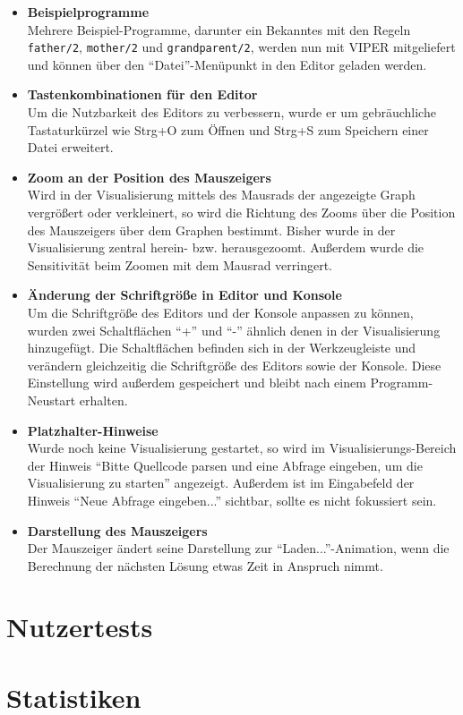 \documentclass[parskip=full,11pt,twoside]{scrartcl}
\begin{document}
\begin{itemize}
  \item \textbf{Beispielprogramme}\\
        Mehrere Beispiel-Programme, darunter ein Bekanntes mit den Regeln \texttt{father/2}, \texttt{mother/2} und \texttt{grandparent/2}, werden nun mit VIPER mitgeliefert und können über den \enquote{Datei}-Menüpunkt in den Editor geladen werden.
  \item \textbf{Tastenkombinationen für den Editor}\\
        Um die Nutzbarkeit des Editors zu verbessern, wurde er um gebräuchliche Tastaturkürzel wie Strg+O zum Öffnen und Strg+S zum Speichern einer Datei erweitert.
  \item \textbf{Zoom an der Position des Mauszeigers}\\
        Wird in der Visualisierung mittels des Mausrads der angezeigte Graph vergrößert oder verkleinert, so wird die Richtung des Zooms über die Position des Mauszeigers über dem Graphen bestimmt. Bisher wurde in der Visualisierung zentral herein- bzw. herausgezoomt. Außerdem wurde die Sensitivität beim Zoomen mit dem Mausrad verringert.
  \item \textbf{Änderung der Schriftgröße in Editor und Konsole}\\
        Um die Schriftgröße des Editors und der Konsole anpassen zu können, wurden zwei Schaltflächen \enquote{+} und \enquote{-} ähnlich denen in der Visualisierung hinzugefügt. Die Schaltflächen befinden sich in der Werkzeugleiste und verändern gleichzeitig die Schriftgröße des Editors sowie der Konsole. Diese Einstellung wird außerdem gespeichert und bleibt nach einem Programm-Neustart erhalten.
  \item \textbf{Platzhalter-Hinweise}\\
        Wurde noch keine Visualisierung gestartet, so wird im Visualisierungs-Bereich der Hinweis \enquote{Bitte Quellcode parsen und eine Abfrage eingeben, um die Visualisierung zu starten} angezeigt. Außerdem ist im Eingabefeld der Hinweis \enquote{Neue Abfrage eingeben...} sichtbar, sollte es nicht fokussiert sein.
  \item \textbf{Darstellung des Mauszeigers}\\
        Der Mauszeiger ändert seine Darstellung zur \enquote{Laden...}-Animation, wenn die Berechnung der nächsten Lösung etwas Zeit in Anspruch nimmt.
\end{itemize}

\section{Nutzertests}


\section{Statistiken}

\end{document}
